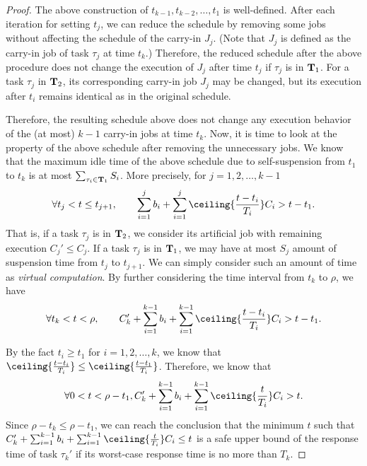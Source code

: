 \begin{proof}
The above construction of $t_{k-1}, t_{k-2}, \ldots, t_1$ is well-defined. After each iteration for setting $t_j$, we can reduce the schedule by removing some jobs without affecting the schedule of the carry-in $J_j$. (Note that $J_j$ is defined as the carry-in job of task $\tau_j$ at time $t_k$.) Therefore, the reduced schedule after the above procedure does not change the execution of $J_j$ after time $t_j$ if $\tau_j$ is in ${\bf T}_1$. For a task $\tau_j$ in ${\bf T}_2$, its corresponding carry-in job $J_j$ may be changed, but its execution after $t_i$ remains identical as in the original schedule. 

Therefore, the resulting schedule above does not change any execution behavior of the (at most) $k-1$ carry-in jobs at time $t_k$. Now, it is time to look at the property of the above schedule after removing the unnecessary jobs. We know that the maximum idle time of the above schedule due to self-suspension from $t_1$ to $t_k$ is at most $\sum_{\tau_i \in {\bf T}_1} S_i$. More precisely, for $j=1,2,\ldots,k-1$
\[
\forall t_j < t \leq t_{j+1},\qquad  \sum_{i=1}^{j} b_i + \sum_{i=1}^j \ceiling{\frac{t- t_i}{T_i} } C_i > t-t_1.
\]
That is, if a task $\tau_j$ is in ${\bf T}_2$, we consider its artificial job with remaining execution $C_j' \leq C_j$.  If a task $\tau_j$ is in ${\bf T}_1$, we may have at most $S_j$ amount of suspension time from $t_j$ to $t_{j+1}$. We can simply consider such an amount of time as \emph{virtual computation}. 
By further considering the time interval from $t_k$ to $\rho$, we have
\[
\forall t_k < t < \rho,\qquad  C_k'+\sum_{i=1}^{k-1} b_i + \sum_{i=1}^{k-1} \ceiling{\frac{t- t_i}{T_i} } C_i > t-t_1.
\]

By the fact $t_i \geq t_1$ for $i=1,2,\ldots,k$, we know that $\ceiling{\frac{t- t_i}{T_i} } \leq \ceiling{\frac{t- t_1}{T_i} }$. Therefore, we know that
\[
\forall 0 < t < \rho-t_1, C_k'+\sum_{i=1}^{k-1} b_i + \sum_{i=1}^{k-1} \ceiling{\frac{t}{T_i} } C_i > t.
\]
Since $\rho-t_k \leq \rho-t_1$, we can reach the conclusion that the minimum $t$ such that $C_k'+\sum_{i=1}^{k-1} b_i + \sum_{i=1}^{k-1} \ceiling{\frac{t}{T_i} } C_i \leq t$ is a safe upper bound of the response time of task $\tau_k'$ if its worst-case response time is no more than $T_k$.
\end{proof}
  
  

  
  
  
  
  
  
  
  
  
  
  
  
  
  
  
  
  
  
  
  
  
  
  
  
  
  
  
  
  
  
  
  
  
  
  
  
  
  
  
  
  
  
  
  
  
  
  
  
  